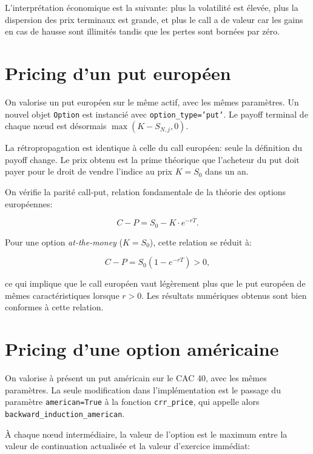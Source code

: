\documentclass[11pt]{report}
\begin{document}
L'interprétation économique est la suivante: plus la volatilité est élevée, plus la dispersion des prix terminaux est grande, et plus le call a de valeur car les gains en cas de hausse sont illimités tandis que les pertes sont bornées par zéro.

\section{Pricing d'un put européen}

On valorise un put européen sur le même actif, avec les mêmes paramètres. Un nouvel objet \texttt{Option} est instancié avec \texttt{option\_type='put'}. Le payoff terminal de chaque nœud est désormais $\max(K - S_{N,j}, 0)$.

La rétropropagation est identique à celle du call européen: seule la définition du payoff change. Le prix obtenu est la prime théorique que l'acheteur du put doit payer pour le droit de vendre l'indice au prix $K = S_0$ dans un an.

On vérifie la parité call-put, relation fondamentale de la théorie des options européennes:

\[
C - P = S_0 - K \cdot e^{-rT}.
\]

Pour une option \textit{at-the-money} ($K = S_0$), cette relation se réduit à:

\[
C - P = S_0 \left(1 - e^{-rT}\right) > 0,
\]

ce qui implique que le call européen vaut légèrement plus que le put européen de mêmes caractéristiques lorsque $r > 0$. Les résultats numériques obtenus sont bien conformes à cette relation.

\section{Pricing d'une option américaine}

On valorise à présent un put américain sur le CAC 40, avec les mêmes paramètres. La seule modification dans l'implémentation est le passage du paramètre \texttt{american=True} à la fonction \texttt{crr\_price}, qui appelle alors \texttt{backward\_induction\_american}.

À chaque nœud intermédiaire, la valeur de l'option est le maximum entre la valeur de continuation actualisée et la valeur d'exercice immédiat:
\end{document}
